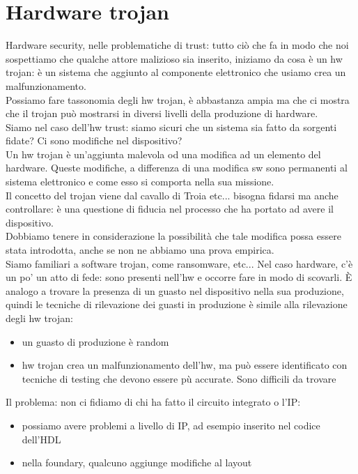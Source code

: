 \documentclass[oneside, 12pt]{extbook}
\begin{document}
\section{Hardware trojan}
Hardware security, nelle problematiche di trust: tutto ciò che fa in modo che noi sospettiamo che qualche attore malizioso sia inserito, iniziamo da cosa è un hw trojan: è un sistema che aggiunto al componente elettronico che usiamo crea un malfunzionamento.\\Possiamo fare tassonomia degli hw trojan, è abbastanza ampia ma che ci mostra che il trojan può mostrarsi in diversi livelli della produzione di hardware.\\Siamo nel caso dell'hw trust: siamo sicuri che un sistema sia fatto da sorgenti fidate? Ci sono modifiche nel dispositivo?\\Un hw trojan è un'aggiunta malevola od una modifica ad un elemento del hardware. Queste modifiche, a differenza di una modifica sw sono permanenti al sistema elettronico e come esso si comporta nella sua missione.\\Il concetto del trojan viene dal cavallo di Troia etc... bisogna fidarsi ma anche controllare: è una questione di fiducia nel processo che ha portato ad avere il dispositivo.\\Dobbiamo tenere in considerazione la possibilità che tale modifica possa essere stata introdotta, anche se non ne abbiamo una prova empirica.\\Siamo familiari a software trojan, come ransomware, etc... Nel caso hardware, c'è un po' un atto di fede: sono presenti nell'hw e occorre fare in modo di scovarli. È analogo a trovare la presenza di un guasto nel dispositivo nella sua produzione, quindi le tecniche di rilevazione dei guasti in produzione è simile alla rilevazione degli hw trojan:
\begin{itemize}
	\item un guasto di produzione è random
	\item hw trojan crea un malfunzionamento dell'hw, ma può essere identificato con tecniche di testing che devono essere pù accurate. Sono difficili da trovare
\end{itemize}
Il problema: non ci fidiamo di chi ha fatto il circuito integrato o l'IP:
\begin{itemize}
	\item  possiamo avere problemi a livello di IP, ad esempio inserito nel codice dell'HDL
	\item nella foundary, qualcuno aggiunge modifiche al layout 
\end{itemize}
\end{document}
